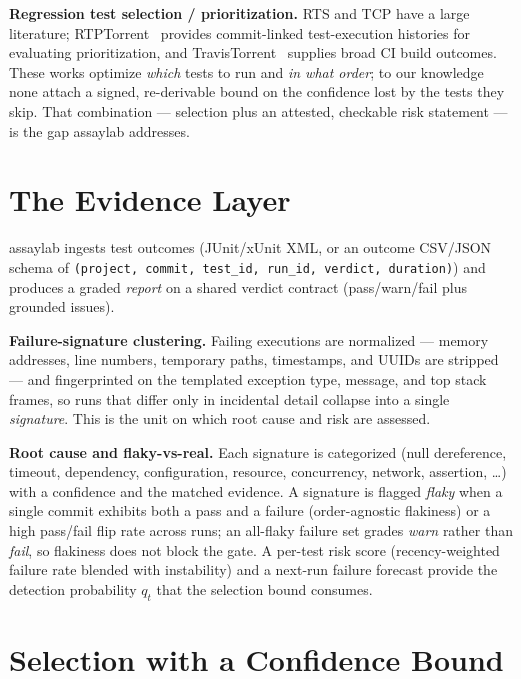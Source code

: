 \documentclass[11pt]{article}
\newcommand{\code}[1]{\texttt{#1}}
\begin{document}
\textbf{Regression test selection / prioritization.} RTS and TCP have a large
literature; RTPTorrent~\cite{rtptorrent} provides commit-linked test-execution
histories for evaluating prioritization, and TravisTorrent~\cite{travistorrent}
supplies broad CI build outcomes. These works optimize \emph{which} tests to run
and \emph{in what order}; to our knowledge none attach a signed, re-derivable
bound on the confidence lost by the tests they skip. That combination ---
selection plus an attested, checkable risk statement --- is the gap assaylab
addresses.

\section{The Evidence Layer}
\label{sec:evidence}

assaylab ingests test outcomes (JUnit/xUnit XML, or an outcome
CSV/JSON schema of \code{(project, commit, test\_id, run\_id, verdict,
duration)}) and produces a graded \emph{report} on a shared verdict contract
(pass/warn/fail plus grounded issues).

\textbf{Failure-signature clustering.} Failing executions are normalized ---
memory addresses, line numbers, temporary paths, timestamps, and UUIDs are
stripped --- and fingerprinted on the templated exception type, message, and top
stack frames, so runs that differ only in incidental detail collapse into a
single \emph{signature}. This is the unit on which root cause and risk are
assessed.

\textbf{Root cause and flaky-vs-real.} Each signature is categorized (null
dereference, timeout, dependency, configuration, resource, concurrency, network,
assertion, \ldots) with a confidence and the matched evidence. A signature is
flagged \emph{flaky} when a single commit exhibits both a pass and a failure
(order-agnostic flakiness) or a high pass/fail flip rate across runs; an
all-flaky failure set grades \emph{warn} rather than \emph{fail}, so flakiness
does not block the gate. A per-test risk score (recency-weighted failure rate
blended with instability) and a next-run failure forecast provide the detection
probability $q_t$ that the selection bound consumes.

\section{Selection with a Confidence Bound}
\label{sec:selection}
\end{document}
